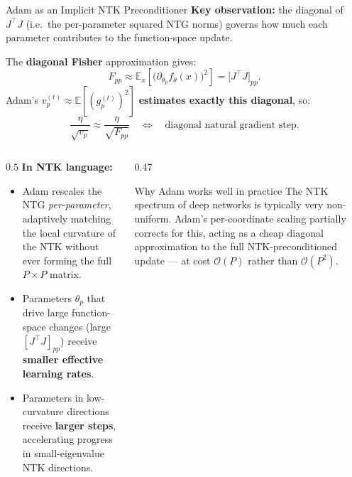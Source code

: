 \documentclass[aspectratio=169, 10pt]{beamer}
\newcommand{\E}{\mathbb{E}}
\newcommand{\highlight}[1]{\textcolor{blue!70!black}{\textbf{#1}}}
\begin{document}
\begin{frame}{Adam as an Implicit NTK Preconditioner}
  \textbf{Key observation:} the diagonal of $J^\top J$ (i.e.\ the per-parameter squared NTG norms)
  governs how much each parameter contributes to the function-space update.

  \vspace{0.3em}
  The \textbf{diagonal Fisher} approximation gives:
  \[
    F_{pp} \approx \E_x\!\left[\bigl(\partial_{\theta_p}f_\theta(x)\bigr)^2\right]
    = \bigl[J^\top J\bigr]_{pp}.
  \]
  Adam's $v_p^{(t)} \approx \E[(g_p^{(t)})^2]$ \textbf{estimates exactly this diagonal}, so:
  \[
    \frac{\eta}{\sqrt{v_p}} \approx \frac{\eta}{\sqrt{F_{pp}}}
    \quad\Leftrightarrow\quad \text{diagonal natural gradient step.}
  \]

  \begin{columns}[T]
    \begin{column}{0.5\textwidth}
      \textbf{In NTK language:}
      \begin{itemize}
        \item Adam rescales the NTG \emph{per-parameter}, adaptively matching the
              local curvature of the NTK without ever forming the full $P\times P$ matrix.
        \item Parameters $\theta_p$ that drive large function-space changes (large $[J^\top J]_{pp}$)
              receive \highlight{smaller effective learning rates}.
        \item Parameters in low-curvature directions receive \highlight{larger steps},
              accelerating progress in small-eigenvalue NTK directions.
      \end{itemize}
    \end{column}
    \begin{column}{0.47\textwidth}
      \begin{exampleblock}{Why Adam works well in practice}
        The NTK spectrum of deep networks is typically very non-uniform.
        Adam's per-coordinate scaling partially corrects for this, acting as a
        cheap diagonal approximation to the full NTK-preconditioned update —
        at cost $\mathcal{O}(P)$ rather than $\mathcal{O}(P^2)$.
      \end{exampleblock}
    \end{column}
  \end{columns}
\end{frame}
\end{document}

